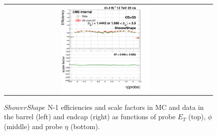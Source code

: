 \begin{figure}[bh]
\begin{center}
\begin{tabular}{cc}
      \includegraphics[width=0.45\textwidth]{figures/Zprime/2017/ScaleFactor/SameSign/N-1/g_compare_cut_eta_Barrel+Endcap_ea_ta_inc_AS_N_1_Shower_PUW.png}
    \end{tabular}
    \caption{$ShowerShape$ N-1 efficiencies and scale factors in MC and data in the barrel (left) and endcap (right) as functions of probe $E_T$ (top), $\phi$ (middle) and probe $\eta$ (bottom).}
    \label{fig:Shower_2017}
  \end{center}
\end{figure}


